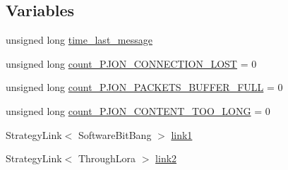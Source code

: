 \subsection*{Variables}
\begin{DoxyCompactItemize}
\item 
unsigned long \hyperlink{BlinkingSwitch__SWBB-TL__semitransparent_8ino_a9ba8dfc203186a2f0979d11ff6b9036b}{time\-\_\-last\-\_\-message}
\item 
unsigned long \hyperlink{BlinkingSwitch__SWBB-TL__semitransparent_8ino_a1d821dadbe06a483b1d7a9a54cbea121}{count\-\_\-\-P\-J\-O\-N\-\_\-\-C\-O\-N\-N\-E\-C\-T\-I\-O\-N\-\_\-\-L\-O\-S\-T} = 0
\item 
unsigned long \hyperlink{BlinkingSwitch__SWBB-TL__semitransparent_8ino_a27c70f9da061a3764d389b5c3e3debdb}{count\-\_\-\-P\-J\-O\-N\-\_\-\-P\-A\-C\-K\-E\-T\-S\-\_\-\-B\-U\-F\-F\-E\-R\-\_\-\-F\-U\-L\-L} = 0
\item 
unsigned long \hyperlink{BlinkingSwitch__SWBB-TL__semitransparent_8ino_a8c3b379e60a8a3c0775b4960428606bf}{count\-\_\-\-P\-J\-O\-N\-\_\-\-C\-O\-N\-T\-E\-N\-T\-\_\-\-T\-O\-O\-\_\-\-L\-O\-N\-G} = 0
\item 
Strategy\-Link$<$ Software\-Bit\-Bang $>$ \hyperlink{BlinkingSwitch__SWBB-TL__semitransparent_8ino_ae2f4f4a5ca9a8a627a5132d1868bf5c0}{link1}
\item 
Strategy\-Link$<$ Through\-Lora $>$ \hyperlink{BlinkingSwitch__SWBB-TL__semitransparent_8ino_a6ab0c6e3e6ae04f06e58b38531729623}{link2}
\end{DoxyCompactItemize}


